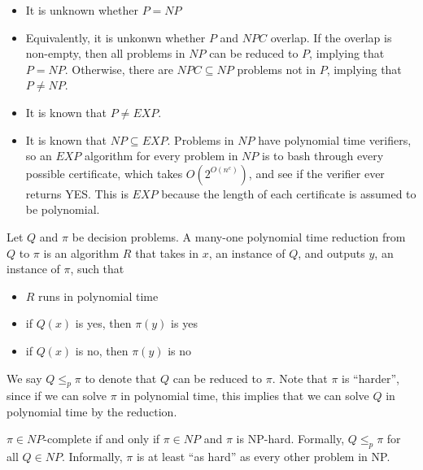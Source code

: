 \begin{itemize}
    \item It is unknown whether $P=NP$
    \item Equivalently, it is unkonwn whether $P$ and $NPC$ overlap. If the overlap is non-empty, then all problems in $NP$ can be reduced to $P$, implying that $P=NP$. Otherwise, there are $NPC\subseteq NP$ problems not in $P$, implying that $P\neq NP$. 
    \item It is known that $P\neq EXP$. 
    \item It is known that $NP\subseteq EXP$. Problems in $NP$ have polynomial time verifiers, so an $EXP$ algorithm for every problem in $NP$ is to bash through every possible certificate, which takes $O(2^{O(n^c)})$, and see if the verifier ever returns YES. This is $EXP$ because the length of each certificate is assumed to be polynomial. 
\end{itemize}

\begin{definition}

Let $Q$ and $\pi$ be decision problems. A many-one polynomial time reduction from $Q$ to $\pi$ is an algorithm $R$ that takes in $x$, an instance of $Q$, and outputs $y$, an instance of $\pi$, such that 
\begin{itemize}
    \item $R$ runs in polynomial time
    \item if $Q(x)$ is yes, then $\pi(y)$ is yes
    \item if $Q(x)$ is no, then $\pi(y)$ is no
\end{itemize}
\end{definition}

We say $Q\leq_p \pi$ to denote that $Q$ can be reduced to $\pi$. Note that $\pi$ is ``harder'', since if we can solve $\pi$ in polynomial time, this implies that we can solve $Q$ in polynomial time by the reduction. 

\begin{definition}

$\pi\in NP$-complete if and only if $\pi\in NP$ and $\pi$ is \ac{NP-hard}. Formally, $Q\leq_p\pi$ for all $Q\in NP$. Informally, $\pi$ is at least ``as hard'' as every other problem in NP. 
\end{definition}